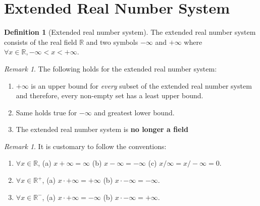 \documentclass[a4paper,12pt]{report}
\newcommand{\R}{\mathbb{R}}
\newcommand{\tb}{\textbf}
\theoremstyle{plain}
\theoremstyle{definition}
\newtheorem{definition}[theorem]{\color{red}Definition} %
\theoremstyle{remark}
\newtheorem{remark}[theorem]{\color{ForestGreen}Remark} %
\begin{document}
\section{Extended Real Number System}
\begin{definition}[Extended real number system]
The extended real number system consists of the real field $\R$ and two symbols $-\infty$ and $+\infty$ where $\forall x\in\R, -\infty<x<+\infty$.
\end{definition}
\begin{remark}
The following holds for the extended real number system:
\begin{enumerate}
\item $+\infty$ is an upper bound for \emph{every} subset of the extended real number system and therefore, every non-empty set has a least upper bound.
\item Same holds true for $-\infty$ and greatest lower bound.
\item The extended real number system is \tb{no longer a field}
\end{enumerate}
\end{remark}
\begin{remark}
It is customary to follow the conventions:
\begin{enumerate}
\item $\forall x\in\R$, (a) $x+\infty=\infty$ (b) $x-\infty=-\infty$ (c) $x/\infty=x/-\infty=0$.
\item $\forall x\in\R^+$, (a) $x\cdot+\infty=+\infty$ (b) $x\cdot-\infty=-\infty$.
\item $\forall x\in\R^-$, (a) $x\cdot+\infty=-\infty$ (b) $x\cdot-\infty=+\infty$.
\end{enumerate}
\end{remark}
\end{document}
